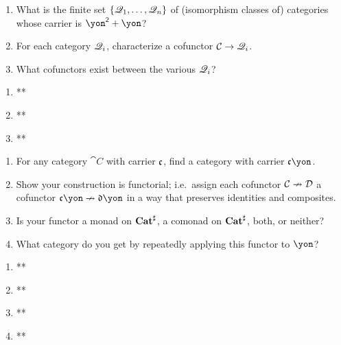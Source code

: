 \documentclass[Book-Poly]{subfiles}
\begin{document}
\begin{exercise}
\begin{enumerate}
	\item What is the finite set $\{\mathscr{Q}_1,\ldots,\mathscr{Q}_n\}$ of (isomorphism classes of) categories whose carrier is $\yon^\2+\yon$? %
	\item For each category $\mathscr{Q}_i$, characterize a cofunctor $\mathcal{C}\to\mathscr{Q}_i$.
	\item What cofunctors exist between the various $\mathscr{Q}_i$?
\qedhere
\end{enumerate}
\begin{solution}
\begin{enumerate}
    \item **
    \item **
    \item **
\end{enumerate}
\end{solution}
\end{exercise}


\begin{exercise}
\begin{enumerate}
	\item For any category $\cat{C}$ with carrier $\mathfrak{c}$, find a category with carrier $\ema{c}\yon$.
	\item Show your construction is functorial; i.e.\ assign each cofunctor $\mathcal{C}\nrightarrow\mathcal{D}$ a cofunctor $\ema{c}\yon\cof\ema{d}\yon$ in a way that preserves identities and composites.
	\item Is your functor a monad on $\mathbf{Cat}^\sharp$, a comonad on $\mathbf{Cat}^\sharp$, both, or neither?
	\item What category do you get by repeatedly applying this functor to $\yon$?
\qedhere
\end{enumerate}
\begin{solution}
\begin{enumerate}
    \item **
    \item **
    \item **
    \item **
\end{enumerate}
\end{solution}
\end{exercise}
\end{document}
